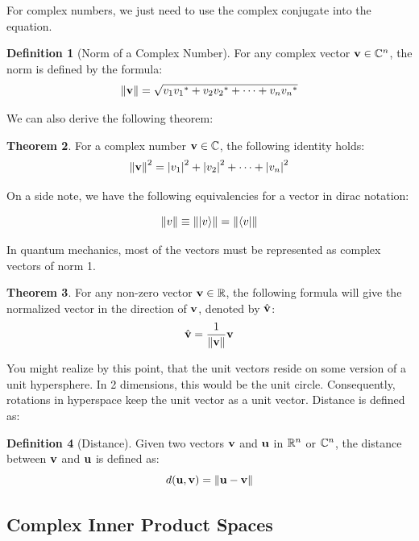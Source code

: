 \documentclass[12pt]{article}
\theoremstyle{definition}
\newtheorem{theorem}{Theorem}[section]
\newtheorem{definition}[theorem]{Definition}
\begin{document}
For complex numbers, we just need to use the complex conjugate into the equation. 

\begin{definition}[Norm of a Complex Number]
    For any complex vector $\mathbf{v} \in \mathbb{C}^n$, the norm is defined by the formula: 
    $$\norm{\mathbf{v}} = \sqrt{v_1 {v_1}^* + v_2 {v_2}^* + \cdots + v_n {v_n}^* }$$
\end{definition}

We can also derive the following theorem:

\begin{theorem}
    For a complex number $\mathbf{v} \in \mathbb{C}$, the following identity holds:
    $$\norm{\mathbf{v}}^2 = \abs{v_1}^2 + \abs{v_2}^2 + \cdots + \abs{v_n}^2$$
\end{theorem}

On a side note, we have the following equivalencies for a vector in dirac notation:

$$\norm{v} \equiv \norm{\ket{v}} = \norm{\bra{v}}$$

In quantum mechanics, most of the vectors must be represented as complex vectors of norm 1. 

\begin{theorem}
    For any non-zero vector $\mathbf{v} \in \mathbb{R}$, the following formula will give the normalized vector in the direction of $\mathbf{v}$, denoted by $\hat{\mathbf{v}}$: $$\hat{\mathbf{v}} = \frac{1}{\norm{\mathbf{v}}}\mathbf{v}$$ 
\end{theorem}

You might realize by this point, that the unit vectors reside on some version of a unit hypersphere. In 2 dimensions, this would be the unit circle. Consequently, rotations in hyperspace keep the unit vector as a unit vector. Distance is defined as:

\begin{definition}[Distance]
    Given two vectors $\mathbf{v}$ and $\mathbf{u}$ in $\mathbb{R}^n$ or $\mathbb{C}^n$, the distance between $\mathbf{v}$ and $\mathbf{u}$ is defined as:
    $$d(\mathbf{u}, \mathbf{v}) = \norm{\mathbf{u} - \mathbf{v}}$$
\end{definition}

\subsection{Complex Inner Product Spaces}
\end{document}
